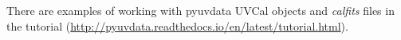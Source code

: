 \documentclass[11pt, oneside, english]{article}   	%
\begin{document}
There are examples of working with pyuvdata UVCal objects and \textit{calfits} files in
the tutorial (\url{http://pyuvdata.readthedocs.io/en/latest/tutorial.html}).
%
%
%
%
\end{document}
